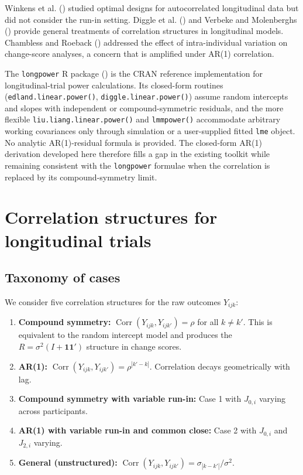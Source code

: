 \documentclass[
  11pt,
]{article}
\begin{document}
Winkens et al. () studied optimal
designs for autocorrelated longitudinal data but did not consider the
run-in setting. Diggle et al. () and
Verbeke and Molenberghs () provide
general treatments of correlation structures in longitudinal models.
Chambless and Roeback () addressed the
effect of intra-individual variation on change-score analyses, a concern
that is amplified under AR(1) correlation.

The \texttt{longpower} R package () is the CRAN reference implementation for
longitudinal-trial power calculations. Its closed-form routines
(\texttt{edland.linear.power()}, \texttt{diggle.linear.power()}) assume
random intercepts and slopes with independent or compound-symmetric
residuals, and the more flexible \texttt{liu.liang.linear.power()} and
\texttt{lmmpower()} accommodate arbitrary working covariances only
through simulation or a user-supplied fitted \texttt{lme} object. No
analytic AR(1)-residual formula is provided. The closed-form AR(1)
derivation developed here therefore fills a gap in the existing toolkit
while remaining consistent with the \texttt{longpower} formulae when the
correlation is replaced by its compound-symmetry limit.

\section{Correlation structures for longitudinal
trials}\label{correlation-structures-for-longitudinal-trials}

\subsection{Taxonomy of cases}\label{taxonomy-of-cases}

We consider five correlation structures for the raw outcomes
\(Y_{ijk}\):

\begin{enumerate}
\def\labelenumi{\arabic{enumi}.}
\item
  \textbf{Compound symmetry:}
  \(\mathop{\mathrm{Corr}}(Y_{ijk}, Y_{ijk'}) = \rho\) for all
  \(k \ne k'\). This is equivalent to the random intercept model and
  produces the \(R = \sigma^2(I +
  \mathbf{1}\mathbf{1}')\) structure in change scores.
\item
  \textbf{AR(1):}
  \(\mathop{\mathrm{Corr}}(Y_{ijk}, Y_{ijk'}) = \rho^{|k'-k|}\).
  Correlation decays geometrically with lag.
\item
  \textbf{Compound symmetry with variable run-in:} Case 1 with
  \(J_{0,i}\) varying across participants.
\item
  \textbf{AR(1) with variable run-in and common close:} Case 2 with
  \(J_{0,i}\) and \(J_{2,i}\) varying.
\item
  \textbf{General (unstructured):}
  \(\mathop{\mathrm{Corr}}(Y_{ijk}, Y_{ijk'}) = \sigma_{|k-k'|}/\sigma^2\).
\end{enumerate}
\end{document}

